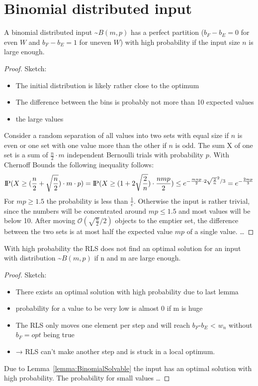 \section{Binomial distributed input}
\begin{lemma}\label{lemma:BinomialSolvable}
    A binomial distributed input \textasciitilde$B(m,p)$ has a perfect partition ($b_F - b_E = 0$ for even $W$ and $b_F - b_E = 1$ for uneven $W$) with high probability if the input size $n$ is large enough.
\end{lemma}
\begin{proof}
    Sketch:
    \begin{itemize}
        \item The initial distribution is likely rather close to the optimum
        \item The difference between the bins is probably not more than 10 expected values
        \item the large values
    \end{itemize}
    Consider a random separation of all values into two sets with equal size if $n$ is even or one set with one value more than the other if $n$ is odd. The sum X of one set is a sum of $\frac{n}{2}\cdot m$ independent Bernoulli trials with probability $p$. With Chernoff Bounds the following inequality follows:
    \[\text{I\kern-0.15em P}(X\ge(\frac{n}{2}+\sqrt{\frac{n}{2}})\cdot m \cdot p) = \text{I\kern-0.15em P}(X\ge(1+2\sqrt{\frac{2}{n}})\cdot \frac{nmp}{2}) \le e^{-\frac{mnp}{2}\cdot2\sqrt{\frac{2}{n}}^2 /3} = e^{-\frac{2mp}{3}}\]
    For $mp\ge1.5$ the probability is less than $\frac{1}{e}$. Otherwise the input is rather trivial, since the numbers will be concentrated around $mp\le1.5$ and most values will be below 10.\newline
    After moving $\mathcal{O}(\sqrt{\frac{n}{2}}/2)$ objects to the emptier set, the difference between the two sets is at most half the expected value $mp$ of a single value.
    \dots
\end{proof}


\begin{lemma}
    With high probability the RLS does not find an optimal solution for an input with distribution \textasciitilde$B(m,p)$ if n and m are large enough.
\end{lemma}
\begin{proof}
    Sketch:
    \begin{itemize}
        \item There exists an optimal solution with high probability due to last lemma
        \item probability for a value to be very low is almost 0 if m is huge
        \item The RLS only moves one element per step and will reach $b_F$-$b_E$ < $w_n$ without $b_F= opt$ being true
        \item → RLS can't make another step and is stuck in a local optimum.
    \end{itemize}
    Due to Lemma~\ref{lemma:BinomialSolvable} the input has an optimal solution with high probability. The probability for small values \dots
\end{proof}